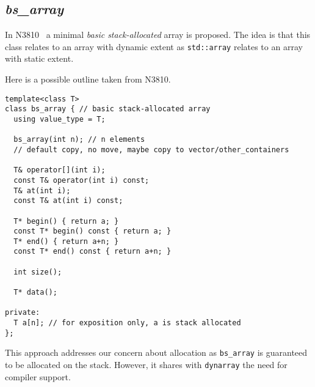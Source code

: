 \subsection{\emph{bs\_array}}

In N3810~\cite{n3810} a minimal \emph{basic stack-allocated} array is proposed.
The idea is that this class relates to an array with dynamic extent as
\verb+std::array+ relates to an array with static extent.

Here is a possible outline taken from N3810.

\begin{lstlisting}
template<class T>
class bs_array { // basic stack-allocated array
  using value_type = T;

  bs_array(int n); // n elements
  // default copy, no move, maybe copy to vector/other_containers

  T& operator[](int i); 
  const T& operator(int i) const; 
  T& at(int i); 
  const T& at(int i) const; 

  T* begin() { return a; } 
  const T* begin() const { return a; }
  T* end() { return a+n; }
  const T* end() const { return a+n; }

  int size();

  T* data();

private:
  T a[n]; // for exposition only, a is stack allocated
};
\end{lstlisting}

This approach addresses our concern about allocation as \verb+bs_array+ is
guaranteed to be allocated on the stack. However, it shares with \verb+dynarray+
the need for compiler support.
